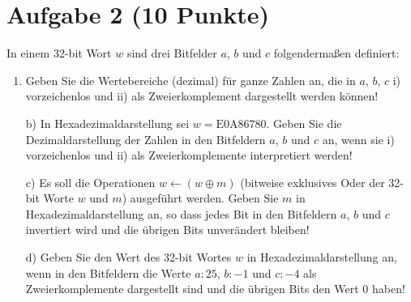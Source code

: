 \section*{Aufgabe 2 (10 Punkte)}

In einem 32-bit Wort $w$ sind drei Bitfelder $a$, $b$ und $c$ folgendermaßen definiert:

\begin{table}[h]
\centering
{}
\end{table}

\begin{enumerate}[label={a)}, leftmargin=*]
\item Geben Sie die Wertebereiche (dezimal) für ganze Zahlen an, die in $a$, $b$, $c$  i) vorzeichenlos und ii) als Zweierkomplement dargestellt werden können!
\item[b)] In Hexadezimaldarstellung sei $w = \text{E0A86780}$. Geben Sie die Dezimaldarstellung der Zahlen in den Bitfeldern $a$, $b$ und $c$ an, wenn sie i) vorzeichenlos und ii) als Zweierkomplemente interpretiert werden!
\item[c)] Es soll die Operationen $w \leftarrow (w \oplus m)$ (bitweise exklusives Oder der 32-bit Worte $w$ und $m$) ausgeführt werden. Geben Sie $m$ in Hexadezimaldarstellung an, so dass jedes Bit in den Bitfeldern $a$, $b$ und $c$ invertiert wird und die übrigen Bits unverändert bleiben!
\item[d)] Geben Sie den Wert des 32-bit Wortes $w$ in Hexadezimaldarstellung an, wenn in den Bitfeldern die Werte $a : 25$, $b : -1$ und $c : -4$ als Zweierkomplemente dargestellt sind und die übrigen Bits den Wert 0 haben!
\end{enumerate}